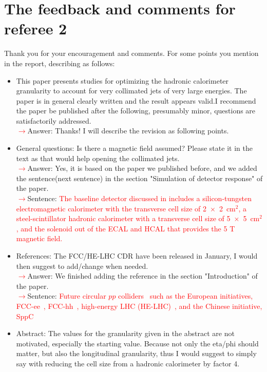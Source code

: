 \documentclass[final,1p,11pt]{elsarticle}
\begin{document}
\section{The feedback and comments for referee 2}
Thank you for your encouragement and comments. For some points you mention in the report, describing as follows:\\
\begin{itemize}
\item This paper presents studies for optimizing the hadronic calorimeter granularity to account for very collimated jets of very large energies.
The paper is in general clearly written and the result appears valid.I recommend the paper be published after the following, presumably minor, questions are satisfactorily addressed.\\
 \textcolor{red}{$\rightarrow$}Answer: Thanks! I will describe the revision as following points.\\
\item General questions: Is there a magnetic field assumed? Please state it in the text as that would help opening the collimated jets.\\
 \textcolor{red}{$\rightarrow$}Answer: Yes, it is based on the paper we published before, and we added the sentence(next sentence) in the section "Simulation of detector response" of the paper.\\
 \textcolor{red}{$\rightarrow$}Sentence: \textcolor{red}{The baseline detector discussed in \cite{Chekanov:2016ppq}
includes a silicon-tungsten electromagnetic calorimeter with the transverse cell size of 2~$\times$~2~cm$^2$, a steel-scintillator hadronic calorimeter with a transverse cell size of 5~$\times$~5~cm$^2$, and the solenoid out of the ECAL and HCAL that provides the 5 T magnetic field.}
\item References: The FCC/HE-LHC CDR have been released in January, I would then suggest to add/change when needed.\\
 \textcolor{red}{$\rightarrow$}Answer: We finished adding the reference in the section "Introduction" of the paper.\\
 \textcolor{red}{$\rightarrow$}Sentence: \textcolor{red}{Future circular $pp$ colliders~\cite{Mangano:2018mur} such as the European initiatives, FCC-ee~\cite{Benedikt:2651299}, FCC-hh~\cite{Benedikt:2018csr}, high-energy LHC (HE-LHC)~\cite{Zimmermann:2018wdi}, and the Chinese initiative, SppC~\cite{Tang:2015qga} }
\item Abstract: The values for the granularity given in the abstract are not motivated, especially the starting value. Because not only the eta/phi should matter, but also the longitudinal granularity, thus I would suggest to simply say with reducing the cell size from a hadronic calorimeter by factor 4.\\

\end{itemize}
\end{document}
